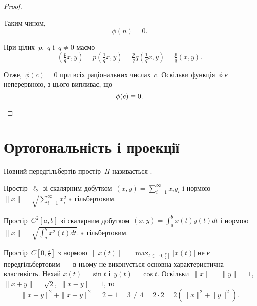 \begin{proof}
\begin{enumerate}
Таким чином,
\begin{equation*}
    \phi(n) = 0.
\end{equation*}

При цілих~$p$,~$q$ і~$q \ne 0$ маємо
\begin{equation*}
    \left( \tfrac{p}{q} x, y \right) =
    p \left( \tfrac{1}{q} x, y \right) =
    \tfrac{p}{q} q \left( \tfrac{1}{q} x, y \right) =
    \tfrac{p}{q} (x, y).
\end{equation*}

Отже,~$\phi(c) = 0$ при всіх раціональних числах~$c$. Оскільки
функція~$\phi$ є неперервною, з цього випливає, що
\begin{equation*}
    \phi(c) \equiv 0. \qedhere
\end{equation*}
\end{enumerate}
\end{proof}

\section{Ортогональність і проекції}

\begin{definition}
Повний передгільбертів простір~$H$ називається .
\end{definition}

\begin{example}
Простір~$\ell_2$
зі скалярним добутком~$(x, y) = \sum_{i = 1}^\infty x_i y_i$
і нормою~$\|x\| = \sqrt{\sum_{i = 1}^\infty x_i^2}$
є гільбертовим.
\end{example}

\begin{example}
Простір~$C^2[a, b]$
зі скалярним добутком~$(x, y) = \int_a^b x(t) y(t) dt$
і нормою~$\|x\| = \sqrt{\int_a^b x^2(t) dt}$.
є гільбертовим.
\end{example}

\begin{example}
Простір~$C[0, \frac{\pi}{2}]$
з нормою~$\|x(t)\| = \max_{t \in [0, \frac{\pi}{2}]} |x(t)|$
не є передгільбертовим~--- в ньому не
виконується основна характеристична властивість. Нехай
$x(t) = \sin t$ і~$y(t) = \cos t$. Оскільки~$\|x\| = \|y\| = 1$,
$\|x + y\| = \sqrt{2}$,~$\|x - y\| = 1$, то
\begin{equation*}
    \|x + y\|^2 + \|x - y\|^2 = 2 + 1 = 3 \ne
    4 = 2 \cdot 2 = 2 (\|x\|^2 + \|y\|^2).
\end{equation*}
\end{example}

